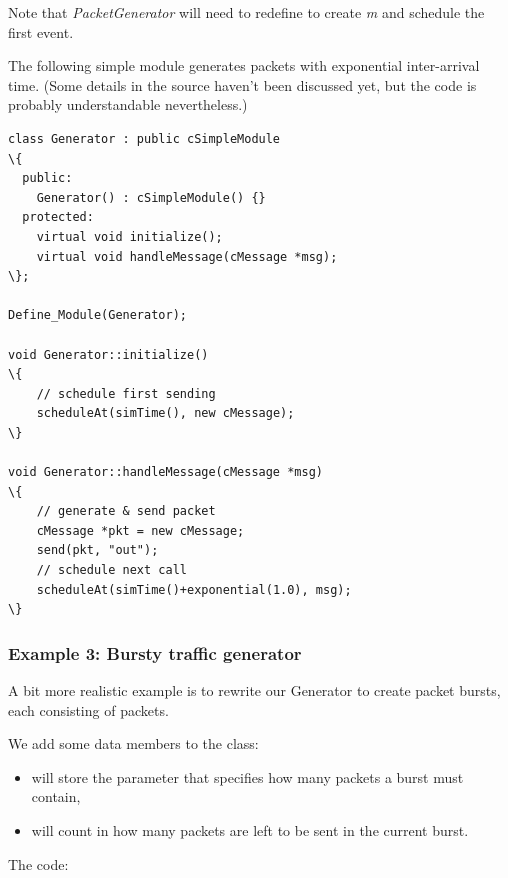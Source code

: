Note that \textit{PacketGenerator} will need to redefine 
to create \textit{m} and schedule the first event.

The following simple module generates packets with exponential
inter-arrival time. (Some details in the source haven't been
discussed yet, but the code is probably understandable nevertheless.)


\begin{Verbatim}[commandchars=\\\{\}]
class Generator : public cSimpleModule
\{
  public:
    Generator() : cSimpleModule() {}
  protected:
    virtual void initialize();
    virtual void handleMessage(cMessage *msg);
\};

Define_Module(Generator);

void Generator::initialize()
\{
    // schedule first sending
    scheduleAt(simTime(), new cMessage);
\}

void Generator::handleMessage(cMessage *msg)
\{
    // generate & send packet
    cMessage *pkt = new cMessage;
    send(pkt, "out");
    // schedule next call
    scheduleAt(simTime()+exponential(1.0), msg);
\}
\end{Verbatim}



\subsubsection{Example 3: Bursty traffic generator}


A bit more realistic example is to rewrite our Generator to create
packet bursts, each consisting of  packets.

We add some data members to the class:
\begin{itemize}
\item{ will store the parameter that specifies how many
    packets a burst must contain,}
\item{ will count in how many packets are left to be sent
    in the current burst.}
\end{itemize}

The code:

